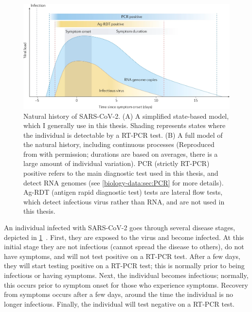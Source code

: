\documentclass[thesis.tex]{subfiles}
\begin{document}
\begin{figure}
{
  }
  \centering\includegraphics[width=\textwidth]{biology-data/natural-history}
  \caption[Natural history of SARS-CoV-2.]{%
    Natural history of SARS-CoV-2.
    (A) A simplified state-based model, which I generally use in this thesis.
    Shading represents states where the individual is detectable by a RT-PCR test.
    (B) A full model of the natural history, including continuous processes (Reproduced from \textcite{puhachSARSCoV2} with permission; durations are based on averages, there is a large amount of individual variation).
    PCR (strictly RT-PCR) positive refers to the main diagnostic test used in this thesis, and detect RNA genomes (see \cref{biology-data:sec:PCR} for more details).
    Ag-RDT (antigen rapid diagnostic test) tests are lateral flow tests, which detect infectious virus rather than RNA, and are not used in this thesis.
  }
  \label{biology-data:fig:natural-history}
\end{figure}

An individual infected with SARS-CoV-2 goes through several disease stages, depicted in \cref{biology-data:fig:natural-history}~\autocite{puhachSARSCoV2}.
First, they are exposed to the virus and become infected.
At this initial stage they are not infectious (cannot spread the disease to others), do not have symptoms, and will not test positive on a RT-PCR test.
After a few days, they will start testing positive on a RT-PCR test; this is normally prior to being infectious or having symptoms.
Next, the individual becomes infectious; normally, this occurs prior to symptom onset for those who experience symptoms.
Recovery from symptoms occurs after a few days, around the time the individual is no longer infectious.
Finally, the individual will test negative on a RT-PCR test.
\end{document}

